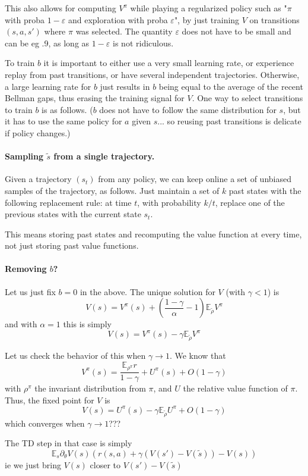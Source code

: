 \documentclass[11pt]{article}
\newcommand{\E}{\mathbb{E}}
\newcommand{\eps}{\varepsilon}
\begin{document}
This also allows for computing $V^\pi$ while playing a regularized policy
such as "$\pi$ with proba $1-\eps$ and exploration with proba $\eps$", by
just training $V$ on transitions $(s,a,s')$ where $\pi$ was selected. The
quantity $\eps$ does not have to be small and can be eg .9, as long as $1-\eps$ is not
ridiculous.

To train $b$ it is important to either use a very small learning rate, or
experience replay from past transitions, or have several independent
trajectories. Otherwise, a large learning rate
for $b$ just results in $b$ being equal to the average of the recent
Bellman gaps, thus erasing the training signal for $V$. One way to select
transitions to train $b$ is as follows. ($b$ does not have to follow the
same distribution for $s$, but it has to use the same policy for $a$
given $s$... so reusing
past transitions is
delicate if policy changes.)

\paragraph{Sampling $\tilde s$ from a single trajectory.} Given a
trajectory $(s_t)$ from any policy, we can keep online a set of unbiased
samples of the trajectory, as follows. Just maintain a set of $k$ past
states with the following replacement rule: at time $t$, with probability
$k/t$, replace one of the previous states with the current state $s_t$.

This means storing past states and recomputing the value function
at every time, not just storing past value functions.

\paragraph{Removing $b$?} Let us just fix $b=0$ in the above. The unique
solution for $V$ (with $\gamma<1$) is
\begin{equation}
V(s)=V^\pi(s)+\left(\frac{1-\gamma}{\alpha}-1\right)\E_{\tilde \rho} V^\pi
\end{equation}
and with $\alpha=1$ this is simply
\begin{equation}
V(s)=V^\pi(s)-\gamma \E_{\tilde \rho} V^\pi
\end{equation}

Let us check the behavior of this when $\gamma\to 1$. We know that
\begin{equation}
V^\pi(s)=\frac{\E_{\rho^\pi}r}{1-\gamma}+U^\pi(s)+O(1-\gamma)
\end{equation}
with $\rho^\pi$ the invariant distribution from $\pi$, and $U$ the
relative value function of $\pi$. Thus, the fixed point for $V$ is
\begin{equation}
V(s)=U^\pi(s)-\gamma \E_{\tilde \rho}U^\pi +O(1-\gamma)
\end{equation}
which converges when $\gamma\to 1$???

The TD step in that case is simply
\begin{equation}
\E_s \partial_\theta V(s) \left(
r(s,a)+\gamma(V(s')-V(\tilde s))-V(s)\right)
\end{equation}
ie we just bring $V(s)$ closer to $V(s')-V(\tilde s)$
\end{document}
